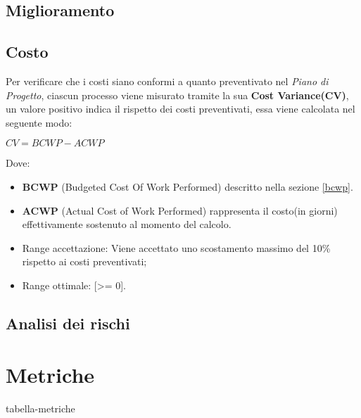\subsection{Miglioramento}
\subsection{Costo}
Per verificare che i costi siano conformi a quanto preventivato nel \textit{Piano di Progetto}, ciascun processo viene misurato tramite la sua \textbf{Cost Variance(CV)}, un valore positivo indica il rispetto dei costi preventivati, essa viene calcolata nel seguente modo:\\ 

\begin{center}
	\begin{math}
	CV = BCWP - ACWP
	\end{math}
\end{center}
Dove:
\begin{itemize}
	\item[] \textbf{BCWP} (Budgeted Cost Of Work Performed) descritto nella sezione \ref{bcwp}.
	\item[] \textbf{ACWP} (Actual Cost of Work Performed) rappresenta il costo(in giorni) effettivamente sostenuto al momento del calcolo. 
\end{itemize}


\begin{itemize}
	\item Range accettazione: Viene accettato uno scostamento massimo del 10\% rispetto ai costi preventivati;
	\item Range ottimale: [>= 0].
\end{itemize}


\subsection{Analisi dei rischi}
\section{Metriche}
tabella-metriche